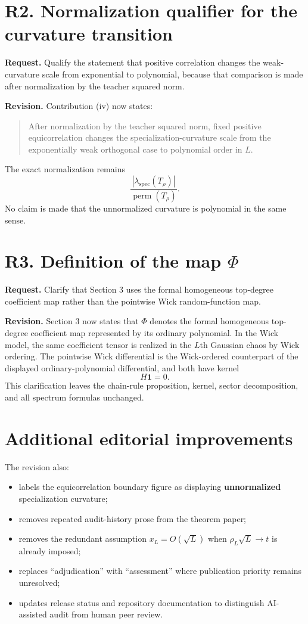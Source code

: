 \documentclass[11pt]{article}
\newcommand{\one}{\mathbf{1}}
\newcommand{\perm}{\operatorname{perm}}
\begin{document}
\section*{R2. Normalization qualifier for the curvature transition}
\textbf{Request.} Qualify the statement that positive correlation changes the weak-curvature scale from exponential to polynomial, because that comparison is made after normalization by the teacher squared norm.

\textbf{Revision.} Contribution (iv) now states:
\begin{quote}
After normalization by the teacher squared norm, fixed positive equicorrelation changes the specialization-curvature scale from the exponentially weak orthogonal case to polynomial order in $L$.
\end{quote}
The exact normalization remains
\[
\frac{|\lambda_{\mathrm{spec}}(T_\rho)|}{\perm(T_\rho)}.
\]
No claim is made that the unnormalized curvature is polynomial in the same sense.

\section*{R3. Definition of the map $\Phi$}
\textbf{Request.} Clarify that Section 3 uses the formal homogeneous top-degree coefficient map rather than the pointwise Wick random-function map.

\textbf{Revision.} Section 3 now states that $\Phi$ denotes the formal homogeneous top-degree coefficient map represented by its ordinary polynomial.  In the Wick model, the same coefficient tensor is realized in the $L$th Gaussian chaos by Wick ordering.  The pointwise Wick differential is the Wick-ordered counterpart of the displayed ordinary-polynomial differential, and both have kernel
\[
H\one=0.
\]
This clarification leaves the chain-rule proposition, kernel, sector decomposition, and all spectrum formulas unchanged.

\section*{Additional editorial improvements}
The revision also:
\begin{itemize}
\item labels the equicorrelation boundary figure as displaying \textbf{unnormalized} specialization curvature;
\item removes repeated audit-history prose from the theorem paper;
\item removes the redundant assumption $x_L=O(\sqrt L)$ when $\rho_L\sqrt L\to t$ is already imposed;
\item replaces ``adjudication'' with ``assessment'' where publication priority remains unresolved;
\item updates release status and repository documentation to distinguish AI-assisted audit from human peer review.
\end{itemize}
\end{document}
